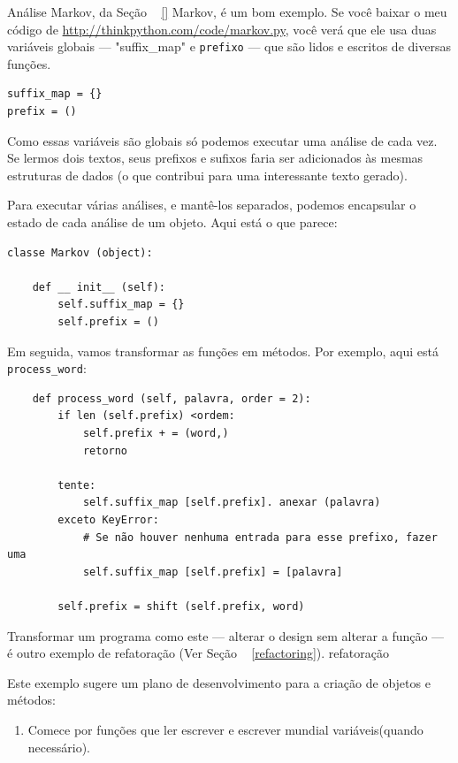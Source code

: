 \documentclass[10pt]{book}
\begin{document}
\begin{v erbatim}
Análise Markov, da Seção ~ \ref {} Markov, é um bom exemplo.
Se você baixar o meu código de \url{http://thinkpython.com/code/markov.py},
você verá que ele usa duas variáveis ​​globais --- \verbo "suffix_map" e
\Verb "prefixo" --- que são lidos e escritos de diversas funções.

\begin{verbatim}
suffix_map = {}        
prefix = ()            
\end{verbatim}

Como essas variáveis ​​são globais
só podemos executar uma análise
de cada vez. Se lermos dois textos, seus prefixos e sufixos faria
ser adicionados às mesmas estruturas de dados (o que contribui para uma interessante
texto gerado).

Para executar várias análises, e mantê-los separados, podemos encapsular
o estado de cada análise de um objeto.
Aqui está o que parece:

\begin{verbatim}
classe Markov (object):

    def __ init__ (self):
        self.suffix_map = {}
        self.prefix = ()    
\end{verbatim}

Em seguida, vamos transformar as funções em métodos. Por exemplo,
aqui está \verb "process_word":

\begin{verbatim}
    def process_word (self, palavra, order = 2):
        if len (self.prefix) <ordem:
            self.prefix + = (word,)
            retorno

        tente:
            self.suffix_map [self.prefix]. anexar (palavra)
        exceto KeyError:
            # Se não houver nenhuma entrada para esse prefixo, fazer uma
            self.suffix_map [self.prefix] = [palavra]

        self.prefix = shift (self.prefix, word)        
\end{verbatim}

Transformar um programa como este --- alterar o design sem
alterar a função --- é outro exemplo de refatoração
(Ver Seção ~ \ref {refactoring}).
\index{} refatoração

Este exemplo sugere um plano de desenvolvimento para a criação de objetos e
métodos:

\begin{enumerate}

\item Comece por funções que ler escrever e escrever mundial
variáveis ​​(quando necessário).


\end{enumerate}
\end{v erbatim}
\end{document}

